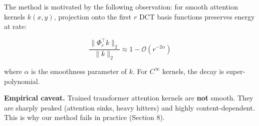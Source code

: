 The method is motivated by the following observation: for smooth attention 
kernels $k(x, y)$, projection onto the first $r$ DCT basis functions 
preserves energy at rate:

\[
\frac{\|\Phi_r^\top k\|_2}{\|k\|_2} \approx 1 - \mathcal{O}(r^{-2\alpha})
\]

where $\alpha$ is the smoothness parameter of $k$. For $C^\infty$ kernels, 
the decay is super-polynomial.

\textbf{Empirical caveat.} Trained transformer attention kernels are \textbf{not} 
smooth. They are sharply peaked (attention sinks, heavy hitters) and highly 
content-dependent. This is why our method fails in practice (Section 8).

